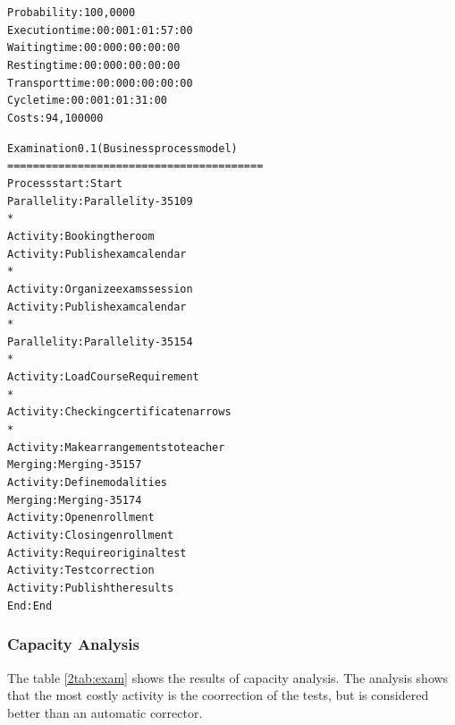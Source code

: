 \begin{alltt}
Probability:   100,0000%
Execution time:  00:001:01:57:00
Waiting time:  00:000:00:00:00
Resting time:  00:000:00:00:00
Transport time:  00:000:00:00:00
Cycle time:  00:001:01:31:00
Costs:  94,100000

Examination 0.1 (Business process model)
========================================
Process start: Start
Parallelity: Parallelity-35109
    *
    Activity: Booking the room
    Activity: Publish exam calendar
    *
    Activity: Organize exams session
    Activity: Publish exam calendar
    *
    Parallelity: Parallelity-35154
        *
        Activity: Load Course Requirement
        *
        Activity: Checking certificate narrows
        *
        Activity: Make arrangements to teacher
    Merging: Merging-35157
    Activity: Define modalities
Merging: Merging-35174
Activity: Open enrollment
Activity: Closing enrollment
Activity: Require original test
Activity: Test correction
Activity: Publish the results
End: End
\end{alltt}

\subsubsection{Capacity Analysis}
The table \ref{2tab:exam} shows the results of capacity analysis.
The analysis shows that the most costly activity is the coorrection of the
tests, but is considered better than an automatic corrector.


